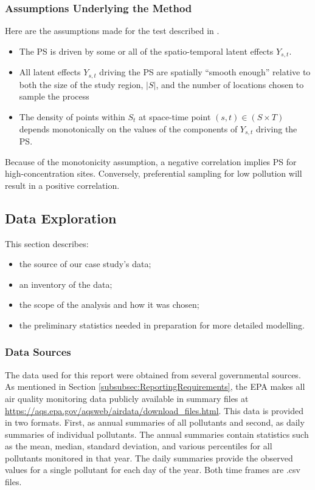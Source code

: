 \documentclass{article}
\begin{document}
\subsubsection*{Assumptions Underlying the Method}
\label{subsubsec:underlyingassumps}
Here are the assumptions made for the test described in \cite{watson2020}.
\begin{itemize}
    \item The \ac{PS} is driven by some or all of the spatio-temporal latent effects $Y_{s,t}$.
    \item  All latent effects $Y_{s,t}$ driving the \ac{PS} are spatially ``smooth enough'' relative to both the size of the study region, $|S|$, and the number of locations chosen to sample the process
    \item The density of points within $S_t$ at space-time point $(s,t) \in (S \times T)$ depends monotonically on the values of the components of $Y_{s,t}$ driving the \ac{PS}.
\end{itemize}

Because of the monotonicity assumption, a negative correlation implies \ac{PS} for high-concentration sites.  Conversely, preferential sampling for low pollution will result in a positive correlation.

%
\subsection{Data Exploration}
\label{subsec:EDA}
This section describes:
\begin{itemize}
    \item the source of our case study's data;
    \item an inventory of the data;
    \item the scope of the analysis and how it was chosen;
    \item the preliminary statistics needed in preparation for more detailed modelling.
\end{itemize}

\subsubsection*{Data Sources}\label{subsec:datasources}
The data used for this report were obtained from several governmental sources. As mentioned in Section \ref{subsubsec:ReportingRequirements}, the \ac{EPA} makes all air quality monitoring data publicly available in summary files at \url{https://aqs.epa.gov/aqsweb/airdata/download_files.html}.  This data is provided in two formats.  First, as annual summaries of all pollutants and second, as daily summaries of individual pollutants.  The annual summaries contain statistics such as the mean, median, standard deviation, and various percentiles for all pollutants monitored in that year.  The daily summaries provide the observed values for a single pollutant for each day of the year.  Both time frames are .csv files.
\end{document}
